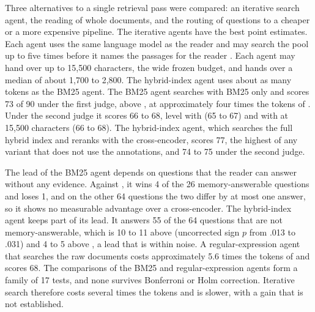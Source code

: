 Three alternatives to a single retrieval pass were compared: an iterative search agent, the reading of whole documents, and the routing of questions to a cheaper or a more expensive pipeline. The iterative agents have the best point estimates. Each agent uses the same language model as the reader and may search the pool up to five times before it names the passages for the reader \citep{yao2023react,jin2025searchr1}. %
Each agent may hand over up to 15,500 characters, the wide frozen budget, and hands over a median of about 1,700 to 2,800. The hybrid-index agent uses about as many tokens as the BM25 agent. The BM25 agent searches with BM25 only and scores 73 of 90 under the first judge, above \hr{}, at approximately four times the tokens of \hybrid{}. Under the second judge it scores 66 to 68, level with \lexb{} (65 to 67) and with \hr{} at 15,500 characters (66 to 68). The hybrid-index agent, which searches the full hybrid index and reranks with the cross-encoder, scores 77, the highest of any variant that does not use the annotations, and 74 to 75 under the second judge. %

The lead of the BM25 agent depends on questions that the reader can answer without any evidence. Against \hr{}, it wins 4 of the 26 memory-answerable questions and loses 1, and on the other 64 questions the two differ by at most one answer, so it shows no measurable advantage over a cross-encoder. The hybrid-index agent keeps part of its lead. It answers 55 of the 64 questions that are not memory-answerable, which is 10 to 11 above \hybrid{} (uncorrected sign $p$ from .013 to .031) and 4 to 5 above \hr{}, a lead that is within noise. A regular-expression agent that searches the raw documents \citep{li2026directcorpus} costs approximately 5.6 times the tokens of \hybrid{} and scores 68. The comparisons of the BM25 and regular-expression agents form a family of 17 tests, and none survives Bonferroni or Holm correction. Iterative search therefore costs several times the tokens and is slower, with a gain that is not established.

